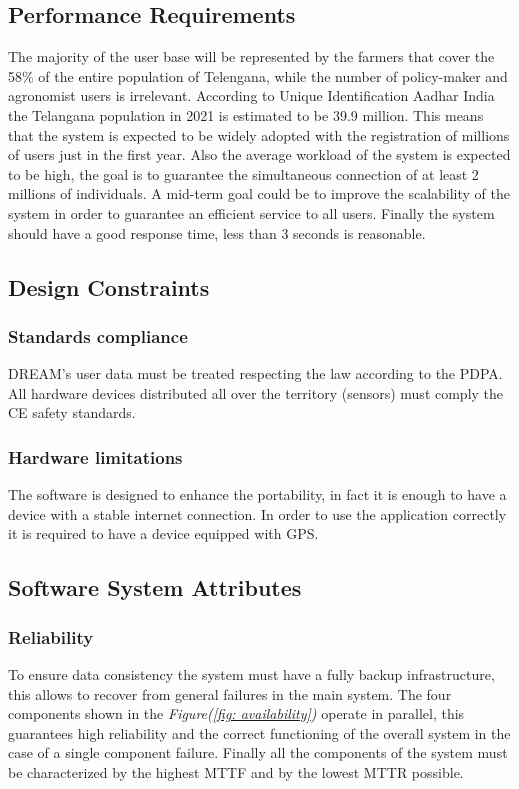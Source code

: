 \documentclass[table, 12pt]{article}
\begin{document}
\subsection{Performance Requirements}
The majority of the user base will be represented by the farmers that cover the 58\% of the entire population of Telengana, while the number of policy-maker and agronomist users is irrelevant.
According to Unique Identification Aadhar India the Telangana population in 2021 is estimated to be 39.9 million.
This means that the system is expected to be widely adopted with the registration of millions of users just in the first year.
Also the average workload of the system is expected to be high, the goal is to guarantee the simultaneous connection of at least 2 millions of individuals.
A mid-term goal could be to improve the scalability of the system in order to guarantee an efficient service to all users.
Finally the system should have a good response time, less than 3 seconds is reasonable.
\subsection{Design Constraints}

\subsubsection{Standards compliance}
DREAM's user data must be treated respecting the law according to the PDPA.
All hardware devices distributed all over the territory (sensors) must comply the CE safety standards.
\subsubsection{Hardware limitations}
The software is designed to enhance the portability, in fact it is enough to have a device with a stable internet connection.
In order to use the application correctly it is required to have a device equipped with GPS.

\subsection{Software System Attributes}
\subsubsection{Reliability}
To ensure data consistency the system must have a fully backup infrastructure, this allows to recover from general failures in the main system.
The four components shown in the \textit{Figure(\ref{fig: availability})} operate in parallel, this guarantees high reliability and the correct functioning of the overall system in the case of a single component failure.
Finally all the components of the system must be characterized by the highest MTTF and by the lowest MTTR possible.
\end{document}
